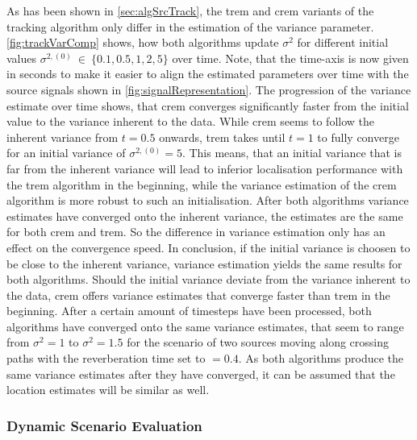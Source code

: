 As has been shown in \autoref{sec:algSrcTrack}, the \gls{trem} and \gls{crem} variants of the tracking algorithm only differ in the estimation of the variance parameter. \autoref{fig:trackVarComp} shows, how both algorithms update $\sigma^2$ for different initial values $\sigma^{2,(0)}\ \in\ \{0.1, 0.5, 1, 2, 5\}$ over time. Note, that the time-axis is now given in seconds to make it easier to align the estimated parameters over time with the source signals shown in \autoref{fig:signalRepresentation}. The progression of the variance estimate over time shows, that \gls{crem} converges significantly faster from the initial value to the variance inherent to the data. While \gls{crem} seems to follow the inherent variance from $t=0.5$ onwards, \gls{trem} takes until $t=1$ to fully converge for an initial variance of $\sigma^{2,(0)}=5$. This means, that an initial variance that is far from the inherent variance will lead to inferior localisation performance with the \gls{trem} algorithm in the beginning, while the variance estimation of the \gls{crem} algorithm is more robust to such an initialisation. After both algorithms variance estimates have converged onto the inherent variance, the estimates are the same for both \gls{crem} and \gls{trem}. So the difference in variance estimation only has an effect on the convergence speed. In conclusion, if the initial variance is choosen to be close to the inherent variance, variance estimation yields the same results for both algorithms. Should the initial variance deviate from the variance inherent to the data, \gls{crem} offers variance estimates that converge faster than \gls{trem} in the beginning. After a certain amount of timesteps have been processed, both algorithms have converged onto the same variance estimates, that seem to range from $\sigma^2=1$ to $\sigma^2=1.5$ for the scenario of two sources moving along crossing paths with the reverberation time set to \Tsixty$=0.4$. As both algorithms produce the same variance estimates after they have converged, it can be assumed that the location estimates will be similar as well.

\setlength{\figureheight}{4cm}
\newcommand{\trajOpacity}{0.2}
\newcommand{\trajSize}{2pt}
\newcommand{\trajLinewidth}{0.5pt}
\newcommand{\estOpacity}{0.2}
\newcommand{\estSize}{4pt}
\newcommand{\estLinewidth}{0.5pt}
\newcommand{\trajDashedLinewidth}{2pt}

\subsubsection{Dynamic Scenario Evaluation}

